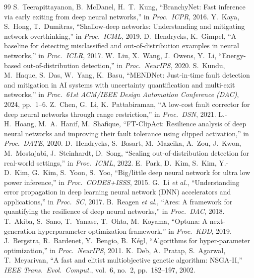 \documentclass[10pt,a4paper]{article}
\begin{document}
\begin{thebibliography}{99}
 S.~Teerapittayanon, B.~McDanel, H.~T.~Kung, ``BranchyNet: Fast inference via early exiting
  from deep neural networks,'' in \emph{Proc.\ ICPR}, 2016.
 Y.~Kaya, S.~Hong, T.~Dumitras, ``Shallow-deep networks: Understanding and mitigating network
  overthinking,'' in \emph{Proc.\ ICML}, 2019.
 D.~Hendrycks, K.~Gimpel, ``A baseline for detecting misclassified and out-of-distribution examples
  in neural networks,'' in \emph{Proc.\ ICLR}, 2017.
 W.~Liu, X.~Wang, J.~Owens, Y.~Li, ``Energy-based out-of-distribution detection,'' in
  \emph{Proc.\ NeurIPS}, 2020.
 S.~Kundu, M.~Haque, S.~Das, W.~Yang, K.~Basu, ``MENDNet: Just-in-time fault detection and
  mitigation in AI systems with uncertainty quantification and multi-exit networks,'' in \emph{Proc.\ 61st
  ACM/IEEE Design Automation Conference (DAC)}, 2024, pp.~1--6.
 Z.~Chen, G.~Li, K.~Pattabiraman, ``A low-cost fault corrector for deep neural networks through
  range restriction,'' in \emph{Proc.\ DSN}, 2021.
 L.-H.~Hoang, M.~A.~Hanif, M.~Shafique, ``FT-ClipAct: Resilience analysis of deep neural
  networks and improving their fault tolerance using clipped activation,'' in \emph{Proc.\ DATE}, 2020.
 D.~Hendrycks, S.~Basart, M.~Mazeika, A.~Zou, J.~Kwon, M.~Mostajabi, J.~Steinhardt, D.~Song,
  ``Scaling out-of-distribution detection for real-world settings,'' in \emph{Proc.\ ICML}, 2022.
 E.~Park, D.~Kim, S.~Kim, Y.-D.~Kim, G.~Kim, S.~Yoon, S.~Yoo, ``Big/little deep neural network
  for ultra low power inference,'' in \emph{Proc.\ CODES+ISSS}, 2015.
 G.~Li \emph{et al.}, ``Understanding error propagation in deep learning neural network (DNN)
  accelerators and applications,'' in \emph{Proc.\ SC}, 2017.
 B.~Reagen \emph{et al.}, ``Ares: A framework for quantifying the resilience of deep neural
  networks,'' in \emph{Proc.\ DAC}, 2018.
 T.~Akiba, S.~Sano, T.~Yanase, T.~Ohta, M.~Koyama, ``Optuna: A next-generation hyperparameter
  optimization framework,'' in \emph{Proc.\ KDD}, 2019.
 J.~Bergstra, R.~Bardenet, Y.~Bengio, B.~K\'egl, ``Algorithms for hyper-parameter optimization,'' in
  \emph{Proc.\ NeurIPS}, 2011.
 K.~Deb, A.~Pratap, S.~Agarwal, T.~Meyarivan, ``A fast and elitist multiobjective genetic algorithm:
  NSGA-II,'' \emph{IEEE Trans.\ Evol.\ Comput.}, vol.~6, no.~2, pp.~182--197, 2002.
\end{thebibliography}
\end{document}
